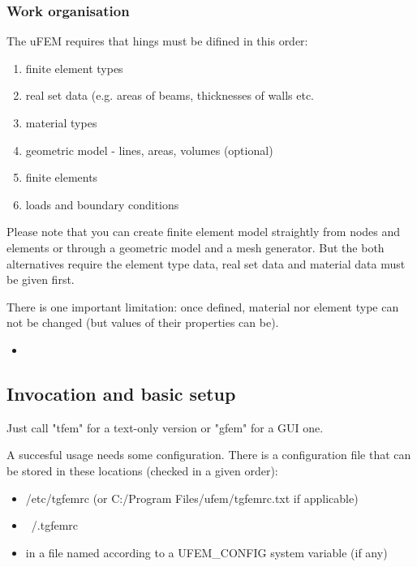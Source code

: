 \documentclass{article}
\begin{document}
\subsubsection{Work organisation}

 The uFEM requires that hings must be difined in this order:


\begin{enumerate}
\item  finite element types
\item  real set data (e.g. areas of beams, thicknesses of walls etc.
\item  material types
\item  geometric model - lines, areas, volumes (optional)
\item  finite elements
\item  loads and boundary conditions
\end{enumerate}

 Please note that you can create finite element model straightly
 from nodes and elements or through a geometric model and a mesh
 generator. But the both alternatives require the element type
 data, real set data and material data must be given first.

 There is one important limitation: once defined, material nor
 element type can not be changed (but values of their properties
 can be).


\begin{itemize}
\item  
\end{itemize}

\subsection{Invocation and basic setup}

 Just call "tfem" for a text-only version or "gfem" for a GUI one.

 A succesful usage needs some configuration. There is 
 a configuration file that can be stored in these
 locations (checked in a given order):


\begin{itemize}
\item  /etc/tgfemrc (or C:/Program Files/ufem/tgfemrc.txt if applicable)
\item  ~/.tgfemrc
\item  in a file named according to a UFEM\_CONFIG system variable (if any)
\end{itemize}
\end{document}

